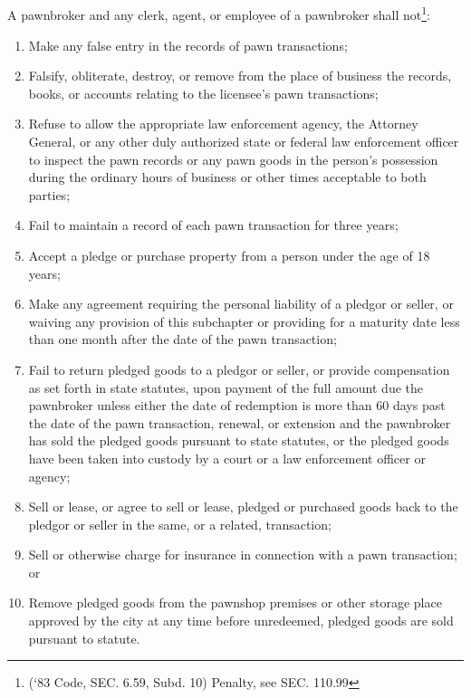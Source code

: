 \subsection{}
A pawnbroker and any clerk, agent, or employee of a pawnbroker shall not\footnote{(‘83 Code, SEC. 6.59, Subd. 10)  Penalty, see SEC. 110.99}:
\begin{enumerate}[{\indent}1)]
    \item Make any false entry in the records of pawn transactions;
    \item Falsify, obliterate, destroy, or remove from the place of business the records, books, or accounts relating to the licensee’s pawn transactions;
    \item Refuse to allow the appropriate law enforcement agency, the Attorney General, or any other duly authorized state or federal law enforcement officer to inspect the pawn records or any pawn goods in the person’s possession during the ordinary hours of business or other times acceptable to both parties;
    \item Fail to maintain a record of each pawn transaction for three years;
    \item Accept a pledge or purchase property from a person under the age of 18 years;
    \item Make any agreement requiring the personal liability of a pledgor or seller, or waiving any provision of this subchapter or providing for a maturity date less than one month after the date of the pawn transaction;
    \item Fail to return pledged goods to a pledgor or seller, or provide compensation as set forth in state statutes, upon payment of the full amount due the pawnbroker unless either the date of redemption is more than 60 days past the date of the pawn transaction, renewal, or extension and the pawnbroker has sold the pledged goods pursuant to state statutes, or the pledged goods have been taken into custody by a court or a law enforcement officer or agency;
    \item Sell or lease, or agree to sell or lease, pledged or purchased goods back to the pledgor or seller in the same, or a related, transaction;
    \item Sell or otherwise charge for insurance in connection with a pawn transaction; or
    \item Remove pledged goods from the pawnshop premises or other storage place approved by the city at any time before unredeemed, pledged goods are sold pursuant to statute.
\end{enumerate}

